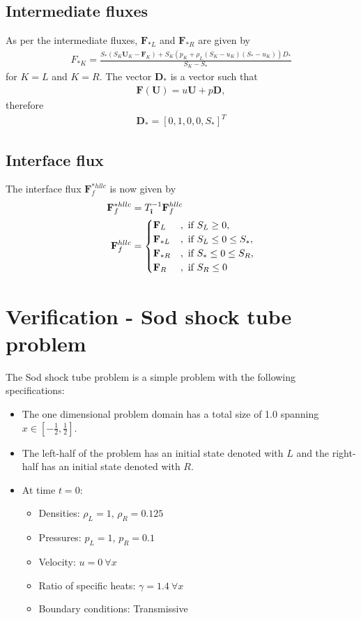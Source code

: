 \documentclass[10pt,letterpaper,notitlepage]{article}
\numberwithin{equation}{section}
\newcommand{\uvec}[1]{\boldsymbol{\hat{\textbf{#1}}}}
\newcommand{\ihat}{\uvec{\i}}
\newcommand{\beqn}{\begin{equation}\begin{aligned}}
\newcommand{\eeqn}{\end{aligned}\end{equation}}
\begin{document}
\subsection{Intermediate fluxes}
As per \cite{Toro} the intermediate fluxes, $\mathbf{F}_{*L}$ and $\mathbf{F}_{*R}$ are given by
\beqn 
F_{*K} = 
\frac
{S_* (S_K \mathbf{U}_K - \mathbf{F}_K) + S_K(p_K+\rho_L(S_K-u_K)(S_*-u_K))D_*}
{S_K - S_*}
\eeqn 
for $K=L$ and $K=R$. The vector $\mathbf{D}_*$ is a vector such that
\beqn 
\mathbf{F}(\mathbf{U}) = u \mathbf{U} + p\mathbf{D},
\eeqn 
therefore 
\beqn 
\mathbf{D}_* = [0,1,0,0,S_*]^T
\eeqn 

\subsection{Interface flux}
The interface flux $\mathbf{F}_f^{*hllc}$ is now given by
\beqn 
\mathbf{F}_f^{*hllc} &= 
T_{\ihat}^{-1} \mathbf{F}_f^{hllc}  \\
\mathbf{F}_f^{hllc} &= 
\begin{cases}
\mathbf{F}_L &,\text{ if } S_L \ge 0, \\
\mathbf{F}_{*L} &,\text{ if } S_L \le 0 \le S_*, \\
\mathbf{F}_{*R} &,\text{ if } S_* \le 0 \le S_R, \\
\mathbf{F}_R &,\text{ if } S_R \le 0
\end{cases}
\eeqn 

\vspace{1cm}
\section{Verification - Sod shock tube problem}
The Sod shock tube problem is a simple problem with the following specifications:
\begin{itemize}
	\item The one dimensional problem domain has a total size of 1.0 spanning $x\in[-\frac{1}{2},\frac{1}{2}]$.
	\item The left-half of the problem has an initial state denoted with $L$ and the right-half has an initial state denoted with $R$.
	\item At time $t=0$:
	\begin{itemize}
		\item Densities: $\rho_L = 1$, $\rho_R = 0.125$
		\item Pressures: $p_L=1$, $p_R=0.1$
		\item Velocity: $u=0 \ \forall x$  
		\item Ratio of specific heats: $\gamma=1.4 \ \forall x$
		\item Boundary conditions: Transmissive
	\end{itemize} 
\end{itemize}
\end{document}

